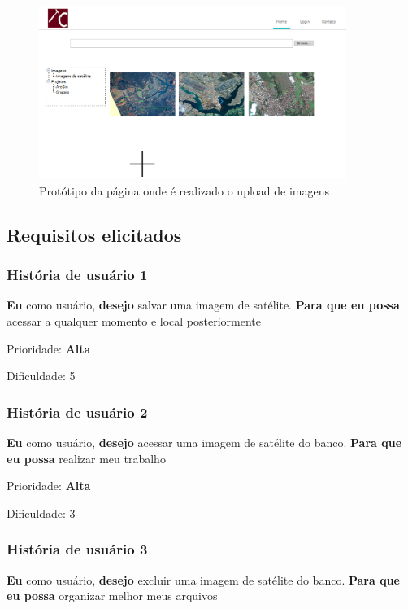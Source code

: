   \begin{figure}[!htb]
    \centering
    \includegraphics[width=10cm, keepaspectratio=false]{figuras/gerencia/pagina-upload.eps}
    \caption{Protótipo da página onde é realizado o upload de imagens}
  \end{figure}

\subsection{Requisitos elicitados}

  \subsubsection{História de usuário 1}
    \textbf{Eu} como usuário, \textbf{desejo} salvar uma imagem de satélite. \textbf{Para que eu possa} acessar a qualquer momento e local posteriormente

    Prioridade: \textbf{Alta}

    Dificuldade: 5

  \subsubsection{História de usuário 2}

    \textbf{Eu} como usuário, \textbf{desejo} acessar uma imagem de satélite do banco. \textbf{Para que eu possa} realizar meu trabalho

    Prioridade: \textbf{Alta}

    Dificuldade: 3

  \subsubsection{História de usuário 3}

    \textbf{Eu} como usuário, \textbf{desejo} excluir uma imagem de satélite do banco. \textbf{Para que eu possa} organizar melhor meus arquivos

